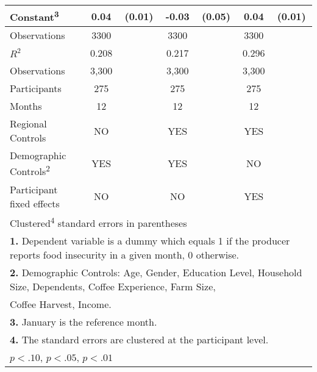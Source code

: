 \begin{table}[htbp]
\begin{tabular}{l*{3}{cc}}
Constant\textsuperscript{3}&        0.04\sym{***}&      (0.01)&       -0.03         &      (0.05)&        0.04\sym{***}&      (0.01)\\
\midrule
Observations        &        3300         &            &        3300         &            &        3300         &            \\
\(R^{2}\)           &       0.208         &            &       0.217         &            &       0.296         &            \\
Observations        &       3,300         &            &       3,300         &            &       3,300         &            \\
Participants        &         275         &            &         275         &            &         275         &            \\
Months              &          12         &            &          12         &            &          12         &            \\
\hline Regional Controls&          NO         &            &         YES         &            &         YES         &            \\
Demographic Controls\textsuperscript{2}&         YES         &            &         YES         &            &          NO         &            \\
Participant fixed effects&          NO         &            &          NO         &            &         YES         &            \\
\bottomrule
\multicolumn{7}{l}{\footnotesize Clustered\textsuperscript{4} standard errors in parentheses}\\
\multicolumn{7}{l}{\footnotesize \textbf{1.} Dependent variable is a dummy which equals 1 if the producer reports food insecurity in a given month, 0 otherwise.}\\
\multicolumn{7}{l}{\footnotesize \textbf{2.} Demographic Controls: Age, Gender, Education Level, Household Size, Dependents, Coffee Experience, Farm Size,}\\
\multicolumn{7}{l}{\footnotesize Coffee Harvest, Income.}\\
\multicolumn{7}{l}{\footnotesize \textbf{3.} January is the reference month.}\\
\multicolumn{7}{l}{\footnotesize \textbf{4.} The standard errors are clustered at the participant level.}\\
\multicolumn{7}{l}{\footnotesize \sym{*} \(p<.10\), \sym{**} \(p<.05\), \sym{***} \(p<.01\)}\\
\end{tabular}
\end{table}
